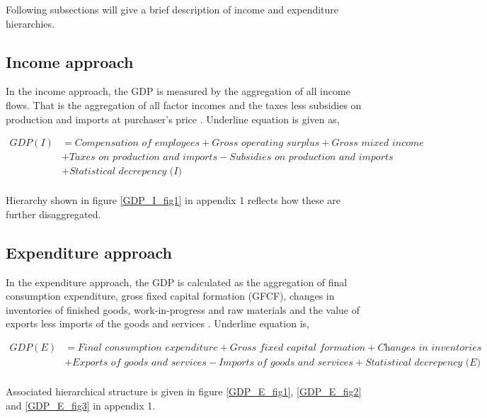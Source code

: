 \documentclass[graybox]{svmult}
\begin{document}
Following subsections will give a brief description of income and expenditure hierarchies.

\subsection{Income approach}

In the income approach, the GDP is measured by the aggregation of all income flows. That is the aggregation of all factor incomes  and the taxes less subsidies on production and imports at purchaser's price \citep{ABS2015}. Underline equation is given as,
\begin{small}
	\begin{align*}
	GDP(I) &= \textit{Compensation of employees} + \textit{Gross operating surplus} + \textit{Gross mixed income}\\ &+ \textit{Taxes on production and imports} - \textit{Subsidies on production and imports}\\ &+ \textit{Statistical decrepency (I)}\\
	\end{align*}
\end{small}
Hierarchy shown in figure \ref{GDP_I_fig1} in appendix 1 reflects how these are further disaggregated.

\subsection{Expenditure approach}

In the expenditure approach, the GDP is calculated as the aggregation of final consumption expenditure, gross fixed capital formation (GFCF), changes in inventories of finished goods, work-in-progress and raw materials and the value of exports less imports of the goods and services \citep{ABS2015}. Underline equation is,

\begin{small}
	\begin{align*}
	GDP(E) &= \textit{Final consumption expenditure} + \textit{Gross fixed capital formation} + \textit{Changes in inventories}\\ &+ \textit{Exports of goods and services} - \textit{Imports of goods and services} + \textit{Statistical decrepency (E)}\\
	\end{align*}
\end{small}
Associated hierarchical structure is given in figure \ref{GDP_E_fig1}, \ref{GDP_E_fig2} and \ref{GDP_E_fig3} in appendix 1.
\end{document}
